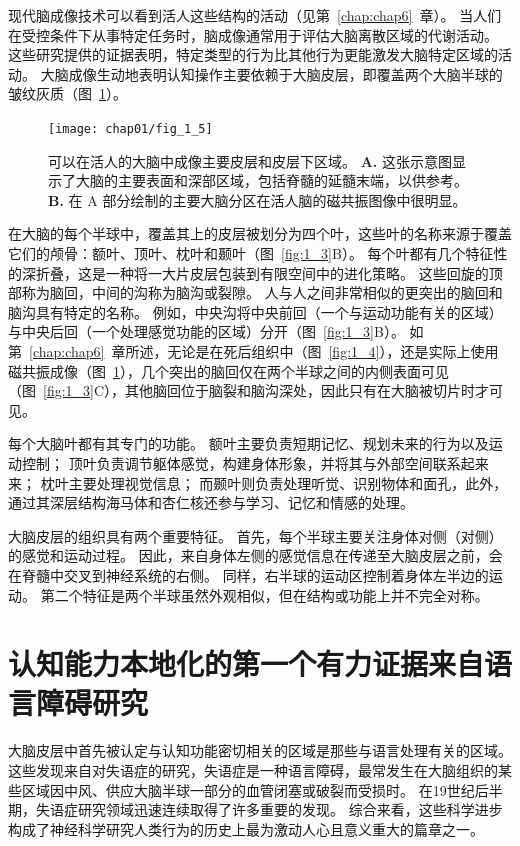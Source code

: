 现代脑成像技术可以看到活人这些结构的活动（见第~\ref{chap:chap6}~章）。
当人们在受控条件下从事特定任务时，脑成像通常用于评估大脑离散区域的代谢活动。
这些研究提供的证据表明，特定类型的行为比其他行为更能激发大脑特定区域的活动。
大脑成像生动地表明认知操作主要依赖于大脑皮层，即覆盖两个大脑半球的皱纹灰质（图~\ref{fig:1_5}）。


\begin{figure}[htbp]
	\centering
	\texttt{[image: chap01/fig\_1\_5]}
	\caption{可以在活人的大脑中成像主要皮层和皮层下区域。
		\textbf{A.} 这张示意图显示了大脑的主要表面和深部区域，包括脊髓的延髓末端，以供参考。
		\textbf{B.} 在 A 部分绘制的主要大脑分区在活人脑的磁共振图像中很明显。}
	\label{fig:1_5}
\end{figure}


在大脑的每个半球中，覆盖其上的皮层被划分为四个叶，这些叶的名称来源于覆盖它们的颅骨：额叶、顶叶、枕叶和颞叶（图~\ref{fig:1_3}B）。
每个叶都有几个特征性的深折叠，这是一种将一大片皮层包装到有限空间中的进化策略。
这些回旋的顶部称为脑回，中间的沟称为脑沟或裂隙。 
人与人之间非常相似的更突出的脑回和脑沟具有特定的名称。
例如，中央沟将中央前回（一个与运动功能有关的区域）与中央后回（一个处理感觉功能的区域）分开（图~\ref{fig:1_3}B）。
如第~\ref{chap:chap6}~章所述，无论是在死后组织中（图~\ref{fig:1_4}），还是实际上使用磁共振成像（图~\ref{fig:1_5}），几个突出的脑回仅在两个半球之间的内侧表面可见（图~\ref{fig:1_3}C），其他脑回位于脑裂和脑沟深处，因此只有在大脑被切片时才可见。


每个大脑叶都有其专门的功能。
额叶主要负责短期记忆、规划未来的行为以及运动控制；
顶叶负责调节躯体感觉，构建身体形象，并将其与外部空间联系起来来；
枕叶主要处理视觉信息；
而颞叶则负责处理听觉、识别物体和面孔，此外，通过其深层结构海马体和杏仁核还参与学习、记忆和情感的处理。


大脑皮层的组织具有两个重要特征。
首先，每个半球主要关注身体对侧（对侧）的感觉和运动过程。
因此，来自身体左侧的感觉信息在传递至大脑皮层之前，会在脊髓中交叉到神经系统的右侧。
同样，右半球的运动区控制着身体左半边的运动。
第二个特征是两个半球虽然外观相似，但在结构或功能上并不完全对称。



\section{认知能力本地化的第一个有力证据来自语言障碍研究}


大脑皮层中首先被认定与认知功能密切相关的区域是那些与语言处理有关的区域。
这些发现来自对失语症的研究，失语症是一种语言障碍，最常发生在大脑组织的某些区域因中风、供应大脑半球一部分的血管闭塞或破裂而受损时。
在19世纪后半期，失语症研究领域迅速连续取得了许多重要的发现。
综合来看，这些科学进步构成了神经科学研究人类行为的历史上最为激动人心且意义重大的篇章之一。


